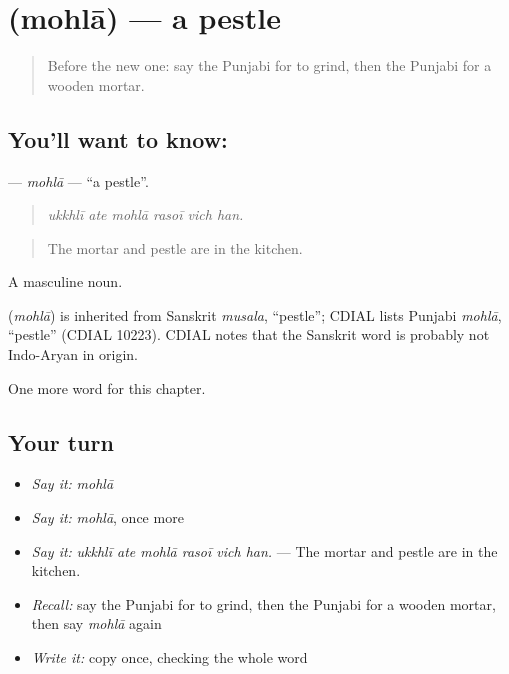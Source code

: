 \section[\texorpdfstring{\pa{ਮੋਹਲਾ} (mohlā)}{ਮੋਹਲਾ (mohlā)}]{ (mohlā) — a pestle}

\label{lesson:PA-C240-mohla}



\begin{quote}
Before the new one: say the Punjabi for to grind, then the Punjabi for a wooden mortar.
\end{quote}

\subsection*{You'll want to know: }
\textbf{} — \emph{mohlā} — \textquotedblleft{}a pestle\textquotedblright{}.

\begin{quote}
     
\end{quote}

\begin{quote}
\emph{ukkhlī ate mohlā rasoī vich han.}
\end{quote}

\begin{quote}
The mortar and pestle are in the kitchen.
\end{quote}

A masculine noun.

\begin{cousinweb}
\textbf{} (\emph{mohlā}) is inherited from Sanskrit \emph{musala}, \textquotedblleft{}pestle\textquotedblright{}; CDIAL lists Punjabi \emph{mohlā}, \textquotedblleft{}pestle\textquotedblright{} (CDIAL 10223). CDIAL notes that the Sanskrit word is probably not Indo-Aryan in origin.
\end{cousinweb}

\begin{grammarlens}[title={What you've built}]
One more word for this chapter.
\end{grammarlens}

\subsection*{Your turn}
\begin{itemize}
\raggedright
  \item \emph{Say it:} \emph{mohlā}
  \item \emph{Say it:} \emph{mohlā}, once more
  \item \emph{Say it:} \emph{ukkhlī ate mohlā rasoī vich han.} — The mortar and pestle are in the kitchen.
  \item \emph{Recall:} say the Punjabi for to grind, then the Punjabi for a wooden mortar, then say \emph{mohlā} again
  \item \emph{Write it:} copy \textbf{} once, checking the whole word
\end{itemize}

